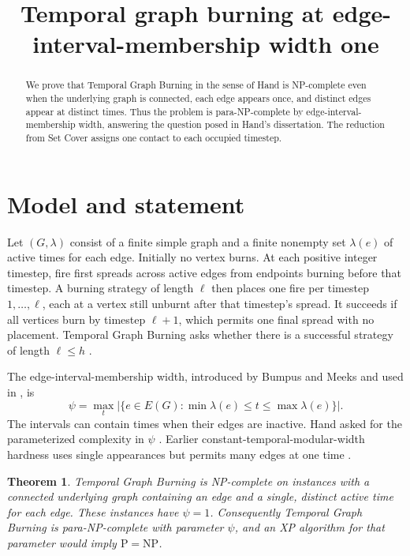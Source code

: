 \documentclass[11pt,a4paper]{amsart}
\title[Temporal graph burning at width one]{Temporal graph burning at edge-interval-membership width one}
\date{}
\newtheorem{theorem}{Theorem}
\begin{document}
\begin{abstract}
We prove that Temporal Graph Burning in the sense of Hand is NP-complete even when the underlying graph is connected, each edge appears once, and distinct edges appear at distinct times. Thus the problem is para-NP-complete by edge-interval-membership width, answering the question posed in Hand's dissertation. The reduction from Set Cover assigns one contact to each occupied timestep.
\end{abstract}
\maketitle

\section{Model and statement}
Let \((G,\lambda)\) consist of a finite simple graph and a finite nonempty set \(\lambda(e)\) of active times for each edge. Initially no vertex burns. At each positive integer timestep, fire first spreads across active edges from endpoints burning before that timestep. A burning strategy of length \(\ell\) then places one fire per timestep \(1,\ldots,\ell\), each at a vertex still unburnt after that timestep's spread. It succeeds if all vertices burn by timestep \(\ell+1\), which permits one final spread with no placement. Temporal Graph Burning asks whether there is a successful strategy of length \(\ell\leq h\) \cite[Definition 17]{hand}.

The edge-interval-membership width, introduced by Bumpus and Meeks \cite{bumpus} and used in \cite[Definition 18]{hand}, is
\[
\psi=\max_t\bigl|\{e\in E(G):\min\lambda(e)\leq t\leq\max\lambda(e)\}\bigr|.
\]
The intervals can contain times when their edges are inactive. Hand asked for the parameterized complexity in \(\psi\) \cite[\S6.1, p.~94]{hand}. Earlier constant-temporal-modular-width hardness uses single appearances but permits many edges at one time \cite[Theorem 5]{dense}.

\begin{theorem}
Temporal Graph Burning is NP-complete on instances with a connected underlying graph containing an edge and a single, distinct active time for each edge. These instances have \(\psi=1\). Consequently Temporal Graph Burning is para-NP-complete with parameter \(\psi\), and an XP algorithm for that parameter would imply \(\mathrm{P}=\mathrm{NP}\).
\end{theorem}
\end{document}
